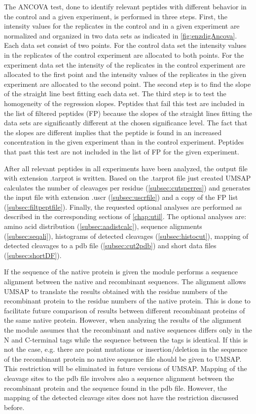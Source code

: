 The ANCOVA test, \label{par:ancovatest} done to identify relevant peptides with different behavior in the control and a given experiment, is performed in three steps. First, the intensity values for the replicates in the control and in a given experiment are normalized and organized in two data sets as indicated in \autoref{fig:enzdigAncova}. Each data set consist of two points. For the control data set the intensity values in the replicates of the control experiment are allocated to both points. For the experiment data set the intensity of the replicates in the control experiment are allocated to the first point and the intensity values of the replicates in the given experiment are allocated to the second point. The second step is to find the slope of the straight line best fitting each data set. The third step is to test the homogeneity of the regression slopes. Peptides that fail this test are included in the list of filtered peptides (FP) because the slopes of the straight lines fitting the data sets are significantly different at the chosen significance level. The fact that the slopes are different implies that the peptide is found in an increased concentration in the given experiment than in the control experiment. Peptides that past this test are not included in the list of FP for the given experiment. 

After all relevant peptides in all experiments have been analyzed, the output file with extension .tarprot is written. Based on the .tarprot file just created UMSAP calculates the number of cleavages per residue (\autoref{subsec:cutsperres}) and generates the input file with extension .uscr (\autoref{subsec:uscrfile}) and a copy of the FP list (\autoref{subsec:filtpeptfile}). Finally, the requested optional analyses are performed as described in the corresponding sections of \autoref{chap:util}. The optional analyses are: amino acid distribution (\autoref{subsec:aadistcalc}), sequence alignments (\autoref{subsec:seqali}), histograms of detected cleavages (\autoref{subsec:histocut}), mapping of detected cleavages to a pdb file (\autoref{subsec:cut2pdb}) and short data files (\autoref{subsec:shortDF}).

If the sequence of the native protein is given the module performs a sequence alignment between the native and recombinant sequences. The alignment allows UMSAP to translate the results obtained with the residue numbers of the recombinant protein to the residue numbers of the native protein. This is done to facilitate future comparison of results between different recombinant proteins of the same native protein. However, when analyzing the results of the alignment the module assumes that the recombinant and native sequences differs only in the N and C-terminal tags while the sequence between the tags is identical. If this is not the case, e.g. there are point mutations or insertion/deletion in the sequence of the recombinant protein no native sequence file should be given to UMSAP. This restriction will be eliminated in future versions of UMSAP. Mapping of the cleavage sites to the pdb file involves also a sequence alignment between the recombinant protein and the sequence found in the pdb file. However, the mapping of the detected cleavage sites does not have the restriction discussed before. 

